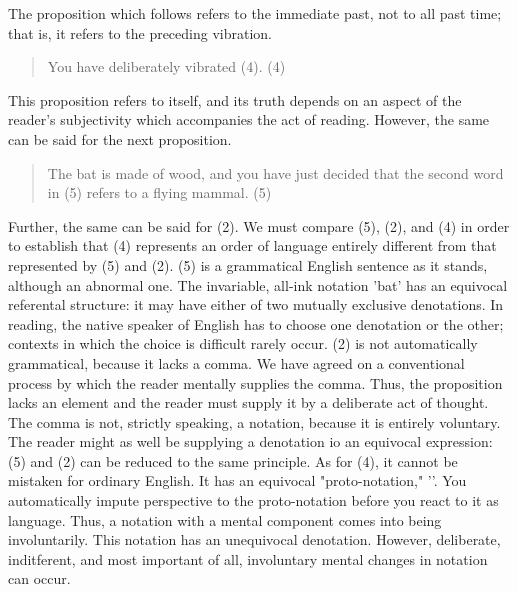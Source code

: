 \documentclass[10pt,twoside,draft]{memoir}
\begin{document}
{{{{\begin{enumerate}
The proposition which follows refers to the immediate past, not to all past 
time; that is, it refers to the preceding vibration. 

\begin{quotation}
You have \cubeframe deliberately vibrated (4). (4) 
\end{quotation}


This proposition refers to itself, and its truth depends on an aspect of the 
reader's subjectivity which accompanies the act of reading. However, the 
same can be said for the next proposition. 

\begin{quotation}
The bat is made of wood, and you have just decided that the second 
word in (5) refers to a flying mammal. (5) 
\end{quotation}


Further, the same can be said for (2). We must compare (5), (2), and (4) in 
order to establish that (4) represents an order of language entirely different 
from that represented by (5) and (2). (5) is a grammatical English sentence 
as it stands, although an abnormal one. The invariable, all-ink notation 'bat' 
has an equivocal referental structure: it may have either of two mutually 
exclusive denotations. In reading, the native speaker of English has to choose 
one denotation or the other; contexts in which the choice is difficult rarely 
occur. (2) is not automatically grammatical, because it lacks a comma. We 
have agreed on a conventional process by which the reader mentally supplies 
the comma. Thus, the proposition lacks an element and the reader must 
supply it by a deliberate act of thought. The comma is not, strictly speaking, 
a notation, because it is entirely voluntary. The reader might as well be 
supplying a denotation io an equivocal expression: (5) and (2) can be 
reduced to the same principle. As for (4), it cannot be mistaken for ordinary 
English. It has an equivocal "proto-notation," '\cubeframe'. You automatically 
impute perspective to the proto-notation before you react to it as language. 
Thus, a notation with a mental component comes into being involuntarily. 
This notation has an unequivocal denotation. However, deliberate, 
inditferent, and most important of all, involuntary mental changes in 
notation can occur. 


\end{enumerate}}}}}
\end{document}
